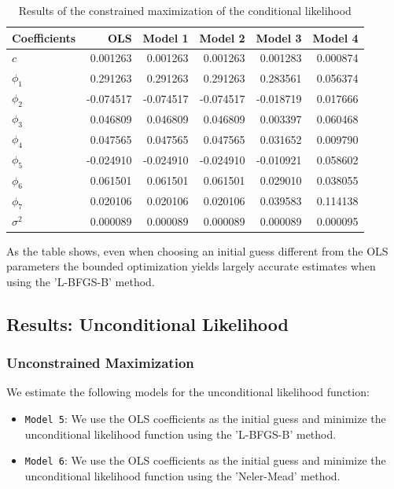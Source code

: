 \documentclass{article}
\begin{document}
\begin{table}[h]
\centering
\caption{Results of the constrained maximization of the conditional likelihood}
\begin{tabular}{lrrrrr}
\toprule
Coefficients & OLS & Model 1 & Model 2 & Model 3 & Model 4 \\
\midrule
$c$ & 0.001263 & 0.001263 & 0.001263 & 0.001283 & 0.000874 \\
$\phi_1$ & 0.291263 & 0.291263 & 0.291263 & 0.283561 & 0.056374 \\
$\phi_2$ & -0.074517 & -0.074517 & -0.074517 & -0.018719 & 0.017666 \\
$\phi_3$ & 0.046809 & 0.046809 & 0.046809 & 0.003397 & 0.060468 \\
$\phi_4$ & 0.047565 & 0.047565 & 0.047565 & 0.031652 & 0.009790 \\
$\phi_5$ & -0.024910 & -0.024910 & -0.024910 & -0.010921 & 0.058602 \\
$\phi_6$ & 0.061501 & 0.061501 & 0.061501 & 0.029010 & 0.038055 \\
$\phi_7$ & 0.020106 & 0.020106 & 0.020106 & 0.039583 & 0.114138 \\
$\sigma^2$ & 0.000089 & 0.000089 & 0.000089 & 0.000089 & 0.000095 \\
\bottomrule
\end{tabular}
\end{table}

As the table shows, even when choosing an initial guess different from the OLS parameters the bounded optimization yields largely accurate estimates when using the 'L-BFGS-B' method.

\subsection{Results: Unconditional Likelihood}
\subsubsection{Unconstrained Maximization}
We estimate the following models for the unconditional likelihood function:
\begin{itemize}
\item \texttt{Model 5}: We use the OLS coefficients as the initial guess and minimize the unconditional likelihood function using the 'L-BFGS-B' method.
\item \texttt{Model 6}: We use the OLS coefficients as the initial guess and minimize the unconditional likelihood function using the 'Neler-Mead' method.
\end{itemize}
\end{document}
